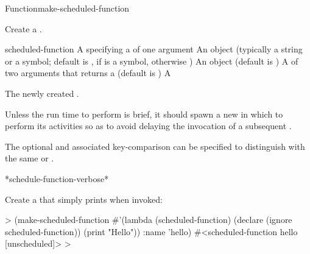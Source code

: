 \begin{functiondoc}{Function}{make-scheduled-function}{ 
     
    \returns{} } 
%
%
%
%

\fnsyntax

\fnpurpose Create a .

\fnpackage {}

\fnmodule {}

\fnargs
\begin{args}{scheduled-function}
\arg[function] A  specifying a
   of one argument 
\arg[name] An object (typically a
  string or a symbol; default is , if
   is a symbol, otherwise \nil)
\arg[key] An object (default is \nil)
\arg[test] A  of two arguments that returns a
 (default is )
 A 
\end{args}

\fnreturns The newly created . 

\fnerrors
\nothreads{}

\fndescription Unless the run time to perform  is
brief, it should spawn a new  in which to perform its activities
so as to avoid delaying the invocation of a subsequent
.

The optional  and associated key-comparison  can be
specified to distinguish  with the same 
or .

\begin{alsos}{*schedule-function-verbose*}
\end{alsos}

\fnexamples
%
Create a  that simply prints 
when invoked:
%
\W\supp
\begin{example}
  > (make-scheduled-function 
      #'(lambda (scheduled-function)
          (declare (ignore scheduled-function))
          (print "Hello"))
      :name 'hello)
  #<scheduled-function hello [unscheduled]>
  >
\end{example}


\end{functiondoc}

